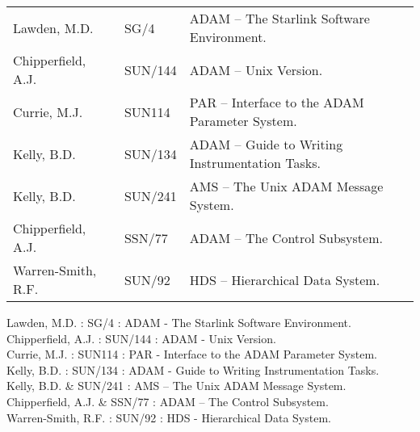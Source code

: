 \documentclass[twoside,11pt]{article}
\newenvironment{latexonly}{}{}
\newcommand{\xref}[3]{#1}
\renewcommand{\_}{\texttt{\symbol{95}}}
\begin{document}
\begin{latexonly}
\begin {tabular}{lll}
Lawden, M.D. & \xref{SG/4}{sg4}{}
& ADAM -- The Starlink Software Environment.\\
Chipperfield, A.J. & \xref{SUN/144}{sun144}{}
& ADAM -- Unix Version.\\
Currie, M.J. & \xref{SUN114}{sun114}{}
& PAR -- Interface to the ADAM Parameter System.\\
Kelly, B.D. & \xref{SUN/134}{sun134}{}
& ADAM -- Guide to Writing Instrumentation Tasks.\\
Kelly, B.D. & \xref{SUN/241}{sun241}{}
& AMS -- The Unix ADAM Message System.\\
Chipperfield, A.J. & \xref{SSN/77}{ssn77}{}
& ADAM -- The Control Subsystem.\\
Warren-Smith, R.F. & \xref{SUN/92}{sun92}{}
& HDS -- Hierarchical Data System.
\end {tabular}
\end{latexonly}
\begin{htmlonly}
Lawden, M.D. : \xref{SG/4}{sg4}{} :
ADAM - The Starlink Software Environment.\\
Chipperfield, A.J. : \xref{SUN/144}{sun144}{} :
ADAM - Unix Version.\\
Currie, M.J. : \xref{SUN114}{sun114}{} :
PAR - Interface to the ADAM Parameter System.\\
Kelly, B.D. : \xref{SUN/134}{sun134}{} :
ADAM - Guide to Writing Instrumentation Tasks.\\
Kelly, B.D. & \xref{SUN/241}{sun241}{} :
AMS -- The Unix ADAM Message System.\\
Chipperfield, A.J. & \xref{SSN/77}{ssn77}{} :
ADAM -- The Control Subsystem.\\
Warren-Smith, R.F. : \xref{SUN/92}{sun92}{} :
HDS - Hierarchical Data System.
\end{htmlonly}
\end{document}
